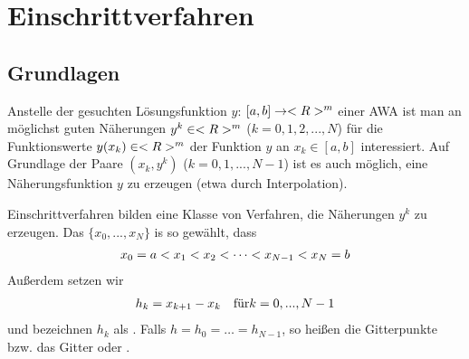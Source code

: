 \section{Einschrittverfahren}
\subsection{Grundlagen}

Anstelle der gesuchten Lösungsfunktion $y$: $[a,b]\to<R>^m$ einer AWA ist man an möglichst guten Näherungen $y^k\in<R>^m$ ($k=0,1,2,...,N$) für die Funktionswerte $y(x_k)\in<R>^m$ der Funktion $y$ an  $x_k\in [a,b]$ interessiert. Auf Grundlage der Paare $(x_k,y^k)$ ($k=0,1,...,N-1$) ist es auch möglich, eine Näherungsfunktion $y$ zu erzeugen (etwa durch Interpolation).

Einschrittverfahren bilden eine Klasse von Verfahren, die Näherungen $y^k$ zu erzeugen. Das  $\{x_0,...,x_N\}$ is so gewählt, dass
\begin{align}
	x_0=a<x_1<x_2<\dots < x_{N-1} < x_N = b\notag
\end{align}
Außerdem setzen wir
\begin{align}
	h_k = x_{k+1}-x_k\quad\text{für} k=0,...,N-1\notag
\end{align}
und bezeichnen $h_k$ als . Falls $h=h_0=\dots=h_{N-1}$, so heißen die Gitterpunkte bzw. das Gitter  oder .

